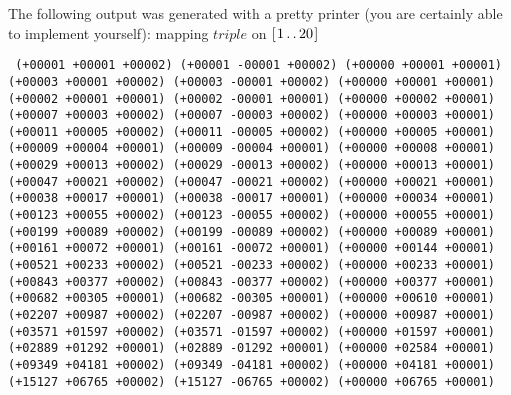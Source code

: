 \documentclass[tikz]{scrreprt}
\newcommand{\Varid}[1]{\mathit{#1}}
\begin{document}
The following output was generated with a pretty printer
(you are certainly able to implement yourself):
mapping \ensuremath{\Varid{triple}} on \ensuremath{[\mskip1.5mu \mathrm{1}\mathinner{\ldotp\ldotp}\mathrm{20}\mskip1.5mu]}

\begin{minipage}{\textwidth}
\begin{center}
\begingroup
\tt
(+00001 +00001 +00002) (+00001 -00001 +00002) (+00000 +00001 +00001)\\
(+00003 +00001 +00002) (+00003 -00001 +00002) (+00000 +00001 +00001)\\
(+00002 +00001 +00001) (+00002 -00001 +00001) (+00000 +00002 +00001)\\
(+00007 +00003 +00002) (+00007 -00003 +00002) (+00000 +00003 +00001)\\
(+00011 +00005 +00002) (+00011 -00005 +00002) (+00000 +00005 +00001)\\
(+00009 +00004 +00001) (+00009 -00004 +00001) (+00000 +00008 +00001)\\
(+00029 +00013 +00002) (+00029 -00013 +00002) (+00000 +00013 +00001)\\
(+00047 +00021 +00002) (+00047 -00021 +00002) (+00000 +00021 +00001)\\
(+00038 +00017 +00001) (+00038 -00017 +00001) (+00000 +00034 +00001)\\
(+00123 +00055 +00002) (+00123 -00055 +00002) (+00000 +00055 +00001)\\
(+00199 +00089 +00002) (+00199 -00089 +00002) (+00000 +00089 +00001)\\
(+00161 +00072 +00001) (+00161 -00072 +00001) (+00000 +00144 +00001)\\
(+00521 +00233 +00002) (+00521 -00233 +00002) (+00000 +00233 +00001)\\
(+00843 +00377 +00002) (+00843 -00377 +00002) (+00000 +00377 +00001)\\
(+00682 +00305 +00001) (+00682 -00305 +00001) (+00000 +00610 +00001)\\
(+02207 +00987 +00002) (+02207 -00987 +00002) (+00000 +00987 +00001)\\
(+03571 +01597 +00002) (+03571 -01597 +00002) (+00000 +01597 +00001)\\
(+02889 +01292 +00001) (+02889 -01292 +00001) (+00000 +02584 +00001)\\
(+09349 +04181 +00002) (+09349 -04181 +00002) (+00000 +04181 +00001)\\
(+15127 +06765 +00002) (+15127 -06765 +00002) (+00000 +06765 +00001)
\endgroup
\end{center}
\end{minipage}
\end{document}

